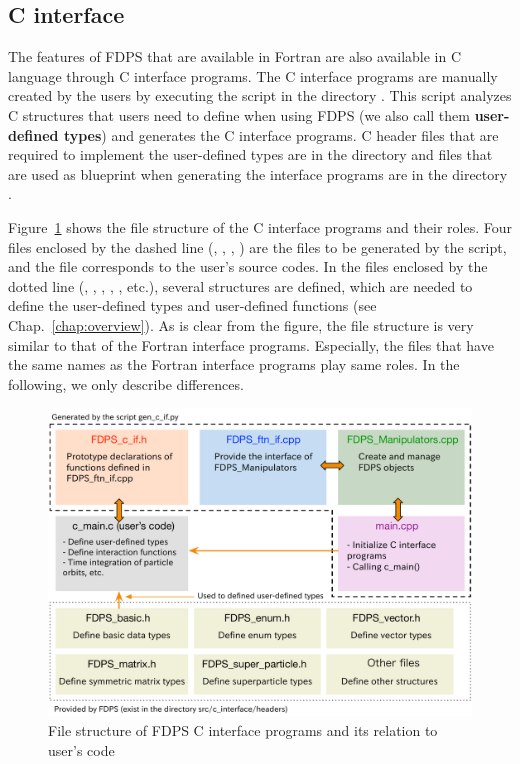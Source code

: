 \subsection{C interface}
\label{subsec:file_str_c_if}
The features of FDPS that are available in Fortran are also available in C language through C interface programs. The C interface programs are manually created by the users by executing the script  in the directory . This script analyzes C structures that users need to define when using FDPS (we also call them \textbf{user-defined types}) and generates the C interface programs. C header files that are required to implement the user-defined types are in the directory  and files that are used as blueprint when generating the interface programs are in the directory .

Figure~\ref{fig:FDPS_c_if_file_str} shows the file structure of the C interface programs and their roles. Four files enclosed by the dashed line (, , , ) are the files to be generated by the script, and the file  corresponds to the user's source codes. In the files enclosed by the dotted line (, , , , , etc.), several structures are defined, which are needed to define the user-defined types and user-defined functions (see Chap.~\ref{chap:overview}). As is clear from the figure, the file structure is very similar to that of the Fortran interface programs. Especially, the files that have the same names as the Fortran interface programs play same roles. In the following, we only describe differences.

\begin{figure}[h]
\centering
\includegraphics[width=\linewidth]{./fig/FDPS_c_if_file_str.pdf}
\caption{File structure of FDPS C interface programs and its relation to user's code}
\label{fig:FDPS_c_if_file_str}
\end{figure}

